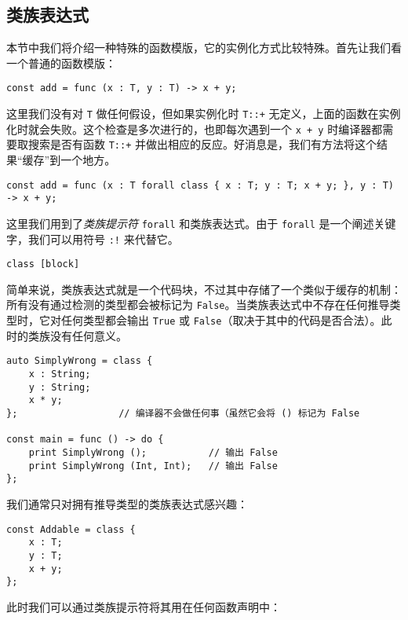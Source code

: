 \subsection{类族表达式}

本节中我们将介绍一种特殊的函数模版，它的实例化方式比较特殊。首先让我们看一个普通的函数模版：

\begin{lstlisting}
const add = func (x : T, y : T) -> x + y;
\end{lstlisting}

这里我们没有对 \lstinline!T! 做任何假设，但如果实例化时 \lstinline!T::+! 无定义，上面的函数在实例化时就会失败。这个检查是多次进行的，也即每次遇到一个 \lstinline!x + y! 时编译器都需要取搜索是否有函数 \lstinline!T::+! 并做出相应的反应。好消息是，我们有方法将这个结果“缓存”到一个地方。

\begin{lstlisting}
const add = func (x : T forall class { x : T; y : T; x + y; }, y : T) -> x + y;
\end{lstlisting}

这里我们用到了\emph{类族提示符} \lstinline!forall! 和类族表达式。由于 \lstinline!forall! 是一个阐述关键字，我们可以用符号 \lstinline|:!| 来代替它。

\begin{grammar} \label{grm:class-expression}
	\lstinline!class [block]!
\end{grammar}

简单来说，类族表达式就是一个代码块，不过其中存储了一个类似于缓存的机制：所有没有通过检测的类型都会被标记为 \lstinline!False!。当类族表达式中不存在任何推导类型时，它对任何类型都会输出 \lstinline!True! 或 \lstinline!False!（取决于其中的代码是否合法）。此时的类族没有任何意义。

\begin{lstlisting}
auto SimplyWrong = class {
	x : String;
	y : String;
	x * y;
};					// 编译器不会做任何事（虽然它会将 () 标记为 False

const main = func () -> do {
	print SimplyWrong ();			// 输出 False
	print SimplyWrong (Int, Int);	// 输出 False
};
\end{lstlisting}

我们通常只对拥有推导类型的类族表达式感兴趣：

\begin{lstlisting}
const Addable = class {
	x : T;
	y : T;
	x + y;
};
\end{lstlisting}

此时我们可以通过类族提示符将其用在任何函数声明中：

